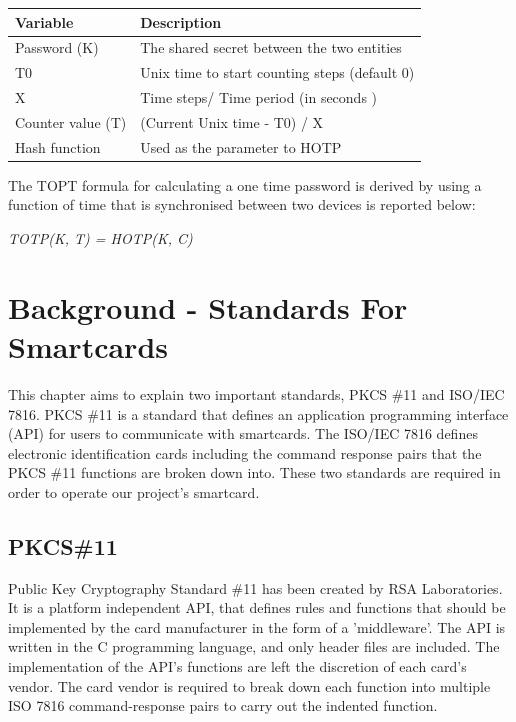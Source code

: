 \documentclass[bsc,frontabs,twoside,singlespacing,parskip,deptreport]{infthesis}     %
\begin{document}
\begin{table}[H]
\begin{tabular}{|l|p{10cm}|}
\hline
Variable & Description\\
\hline
Password (K) & The shared secret between the two entities\\
\hline
T0 & Unix time to start counting steps (default 0)\\
\hline
X & Time steps/ Time period  (in seconds )\\
\hline
Counter value (T) & (Current Unix time - T0) / X\\
\hline
Hash function & Used as the parameter to HOTP\\
\hline
\end{tabular}
\end{table}

The TOPT formula for calculating a one time password is derived by using a function of time that is synchronised between two devices is reported below:

\begin{center}
\textit{ TOTP(K, T) = HOTP(K, C)}
\end{center}


\chapter{Background - Standards For Smartcards}

This chapter aims to explain two important standards, PKCS \#11 and ISO/IEC 7816. PKCS \#11 is a standard that defines an application programming interface (API) for users to communicate with smartcards. The ISO/IEC 7816 defines electronic identification cards including the command response pairs that the PKCS \#11 functions are broken down into. These two standards are required in order to operate our project's smartcard.


\section{PKCS\#11}
Public Key Cryptography Standard \#11 has been created by RSA Laboratories. It is a platform independent API, that defines rules and functions that should be implemented by the card manufacturer in the form of a 'middleware'. The API is written in the C programming language, and only header files are included. The implementation of the API's functions are left the discretion of each card's vendor. The card vendor is required to break down each function into multiple ISO 7816 command-response pairs to carry out the indented function.
\end{document}
